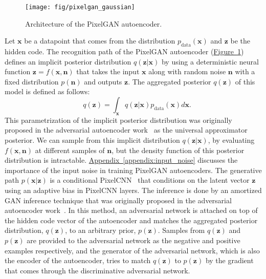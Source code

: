 \documentclass{article}
\newcommand{\myfig}[1]{\hyperref[fig:#1]{Figure~\ref*{fig:#1}}}
\newcommand{\myappendix}[1]{\hyperref[appendix:#1]{Appendix~\ref*{appendix:#1}}}
\begin{document}
\begin{figure}[t]
\begin{center}
\texttt{[image: fig/pixelgan\_gaussian]}
\end{center}
\vspace{-.3cm}
\caption{\label{fig:pixelgan_gaussian}Architecture of the PixelGAN autoencoder.}
\end{figure}
Let $\mathbf{x}$ be a datapoint that comes from the distribution $p_\text{data}(\mathbf{x})$ and $\mathbf{z}$ be the hidden code. The recognition path of the PixelGAN autoencoder (\myfig{pixelgan_gaussian}) defines an implicit posterior distribution $q(\mathbf{z}|\mathbf{x})$ by using a deterministic neural function $\mathbf{z} = f(\mathbf{x},\mathbf{n})$ that takes the input $\mathbf{x}$ along with random noise $\mathbf{n}$ with a fixed distribution $p(\mathbf{n})$ and outputs $\mathbf{z}$. The aggregated posterior $q(\mathbf{z})$ of this model is defined as follows:
$$\quad q(\mathbf{z}) = \int_\mathbf{x} q(\mathbf{z}|\mathbf{x}) p_\text{data}(\mathbf{x}) d\mathbf{x}.
$$
This parametrization of the implicit posterior distribution was originally proposed in the adversarial autoencoder work~\citep{aae} as the universal approximator posterior. We can sample from this implicit distribution $q(\mathbf{z}|\mathbf{x})$, by evaluating $f(\mathbf{x},\mathbf{n})$ at different samples of $\mathbf{n}$, but the density function of this posterior distribution is intractable. \myappendix{input_noise} discusses the importance of the input noise in training PixelGAN autoencoders. 
The generative path $p(\mathbf{x}|\mathbf{z})$ is a conditional PixelCNN~\citep{pixelcnn} that conditions on the latent vector $\mathbf{z}$ using an adaptive bias in PixelCNN layers. The inference is done by an amortized GAN inference technique that was originally proposed in the adversarial autoencoder work~\citep{aae}. In this method, an adversarial network is attached on top of the hidden code vector of the autoencoder and matches the aggregated posterior distribution, $q(\mathbf{z})$, to an arbitrary prior, $p(\mathbf{z})$. Samples from $q(\mathbf{z})$ and $p(\mathbf{z})$ are provided to the adversarial network as the negative and positive examples respectively, and the generator of the adversarial network, which is also the encoder of the autoencoder, tries to match $q(\mathbf{z})$ to $p(\mathbf{z})$ by the gradient that comes through the discriminative adversarial network. 
\end{document}
